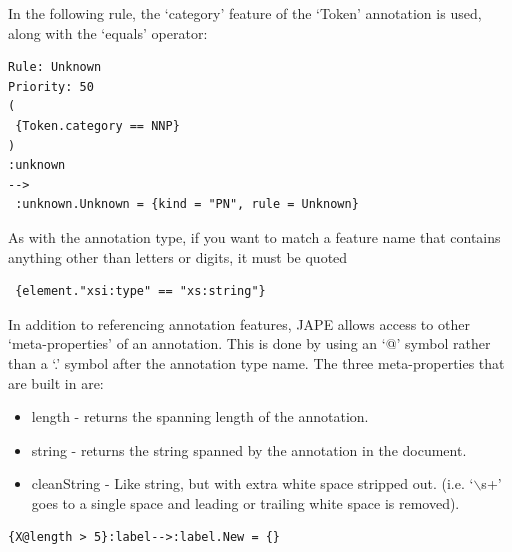In the following rule, the `category' feature of the `Token' annotation is
used, along with the `equals' operator:

\begin{small}
\begin{verbatim}
Rule: Unknown
Priority: 50
( 
 {Token.category == NNP}
) 
:unknown
-->
 :unknown.Unknown = {kind = "PN", rule = Unknown}
\end{verbatim}
\end{small}

As with the annotation type, if you want to match a feature name that contains
anything other than letters or digits, it must be quoted

\begin{small}
\begin{verbatim}
 {element."xsi:type" == "xs:string"}
\end{verbatim}
\end{small}


In addition to referencing annotation features, 
JAPE allows access to other `meta-properties' of an annotation.  This is done 
by using an `@' symbol rather than a `.' symbol after the annotation type name.
The three meta-properties that are built in are:
\begin{itemize}
\item length - returns the spanning length of the annotation.
\item string - returns the string spanned by the annotation in the document.
\item cleanString - Like string, but with extra white space stripped out.  
(i.e. `$\backslash$s+' goes to a single space and leading or trailing white 
space is removed).
\end{itemize}

\begin{small}
\begin{verbatim}
{X@length > 5}:label-->:label.New = {}
\end{verbatim}
\end{small}  



